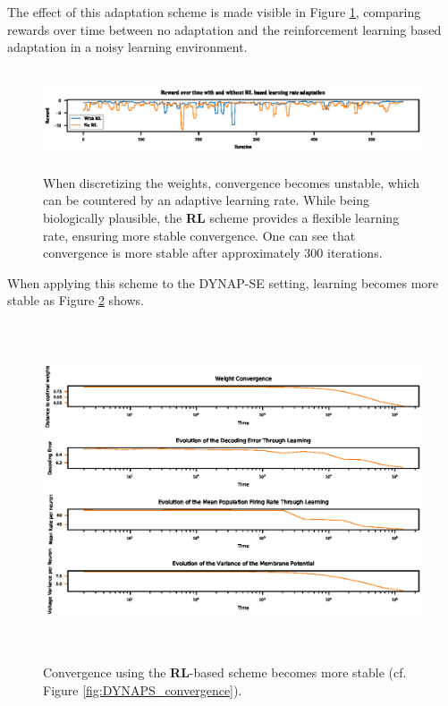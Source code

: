 \documentclass[twoside,11pt]{article}
\begin{document}
The effect of this adaptation scheme is made visible in Figure \ref{fig:rewards}, comparing
rewards over time between no adaptation and the reinforcement learning based adaptation in a
noisy learning environment.

\begin{figure}[!htb]
  \centering
  \includegraphics[width = \columnwidth, height=3.0cm]{figures/rl_based_lr_adaptation.eps}
  \caption{When discretizing the weights, convergence becomes unstable, which can be countered
  by an adaptive learning rate. While being biologically plausible, the \textbf{RL} scheme provides
  a flexible learning rate, ensuring more stable convergence. One can see that convergence
  is more stable after approximately 300 iterations.}
  \label{fig:rewards}
\end{figure}

When applying this scheme to the DYNAP-SE setting, learning becomes more stable as Figure \ref{fig:stable}
shows.

\begin{figure}[!htb]
  \centering
  \includegraphics[width = \columnwidth, height=10cm]{figures/DYNAPS_convergence_stable.eps}
  \caption{Convergence using the \textbf{RL}-based scheme becomes more stable (cf. Figure \ref{fig:DYNAPS_convergence}).}
  \label{fig:stable}
\end{figure}
\end{document}
